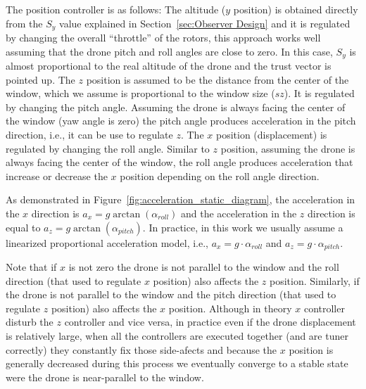 \documentclass[ twoside, 12pt ]{article}
\begin{document}
The position controller is as follows:
The altitude ($y$ position) is obtained directly from the $S_y$ value explained in Section~\ref{sec:Observer Design} and it is regulated by changing the overall ``throttle'' of the rotors, this approach works well assuming that the drone pitch and roll angles are close to zero. In this case, $S_y$ is almost proportional to the real altitude of the drone and the trust vector is pointed up.
The $z$ position is assumed to be the distance from the center of the window, which we assume is proportional to the window size ($sz$). It is regulated by changing the pitch angle. Assuming the drone is always facing the center of the window (yaw angle is zero) the pitch angle produces acceleration in the pitch direction, i.e., it can be use to regulate $z$.
The $x$ position (displacement) is regulated by changing the roll angle. Similar to $z$ position, assuming the drone is always facing the center of the window, the roll angle produces acceleration that increase or decrease the $x$ position depending on the roll angle direction.

As demonstrated in Figure~\ref{fig:acceleration_static_diagram}, the acceleration in the $x$ direction is $a_x=g \arctan(\alpha_{roll})$ and the acceleration in the $z$ direction is equal to $a_z=g \arctan(\alpha_{pitch})$. 
In practice, in this work we usually assume a linearized proportional acceleration model, i.e., $a_x=g \cdot \alpha_{roll}$ and $a_z=g \cdot \alpha_{pitch}$.

Note that if $x$ is not zero the drone is not parallel to the window and the roll direction (that used to regulate $x$ position) also affects the $z$ position.
Similarly, if the drone is not parallel to the window and the pitch direction (that used to regulate $z$ position) also affects the $x$ position.
Although in theory $x$ controller disturb the $z$ controller and vice versa, in practice even if the drone displacement is relatively large, when all the controllers are executed together (and are tuner correctly) they constantly fix those side-afects and because the $x$ position is generally decreased during this process we eventually converge to a stable state were the drone is near-parallel to the window.
\end{document}
